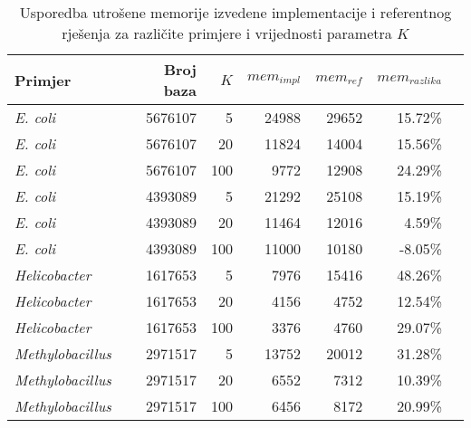 \documentclass[times, utf8, seminar, numeric]{fer}
\begin{document}
\begin{table}[h]
	\centering
	\caption{Usporedba utrošene memorije izvedene implementacije i referentnog rješenja za različite primjere i vrijednosti parametra $K$}
	\label{tbl:results}
	
	\begin{tabular}{lrrrrrr}
		\hline
		Primjer & Broj baza & $K$ & $mem_{impl}$ & $mem_{ref}$ & $mem_{razlika}$ \\ \hline
        \textit{E. coli} & 5676107 & 5 & 24988 & 29652 & 15.72\% \\
        \textit{E. coli} & 5676107 & 20 & 11824 & 14004 & 15.56\% \\
        \textit{E. coli} & 5676107 & 100 & 9772 & 12908 & 24.29\% \\ \hline
        \textit{E. coli} & 4393089 & 5 & 21292 & 25108 & 15.19\% \\
        \textit{E. coli} & 4393089 & 20 & 11464 & 12016 & 4.59\% \\
        \textit{E. coli} & 4393089 & 100 & 11000 & 10180 & -8.05\% \\ \hline
        \textit{Helicobacter} & 1617653 & 5 & 7976 & 15416 & 48.26\% \\
        \textit{Helicobacter} & 1617653 & 20 & 4156 & 4752 & 12.54\% \\
        \textit{Helicobacter} & 1617653 & 100 & 3376 & 4760 & 29.07\% \\ \hline
        \textit{Methylobacillus} & 2971517 & 5 & 13752 & 20012 & 31.28\% \\
        \textit{Methylobacillus} & 2971517 & 20 & 6552 & 7312 & 10.39\% \\
        \textit{Methylobacillus} & 2971517 & 100 & 6456 & 8172 & 20.99\% \\
    \hline
	\end{tabular}
\end{table}
\end{document}
